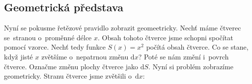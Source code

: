 \subsection{Geometrická představa}

Nyní se pokusme řetězové pravidlo zobrazit geomeetricky. Nechť máme čtverec se~stranou o~proměnné délce $x$. Obsah tohoto čtverce jsme schopni spočítat pomocí vzorce. Nechť tedy funkce $S(x) = x^2$ počítá obsah čtverce. Co se stane, když jisté $x$ zvětšíme o~nepatrnou změnu $\text{d}x$? Poté se nám změní i~povrch čtverce. Označme změnu plochy čtverce jako $\text{d}S$. Nyní si problém zobrazíme geometricky. Stranu čtverce jsme zvětšili o~$\text{d}x$:


